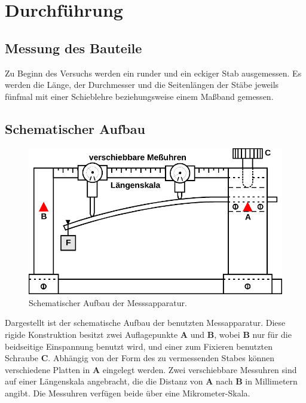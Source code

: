 \section{Durchführung} \label{sec:durchführung}

\subsection{Messung des Bauteile} \label{sec:bauteile}

    Zu Beginn des Versuchs werden ein runder und ein eckiger Stab ausgemessen.
    Es werden die Länge, der Durchmesser und die Seitenlängen der Stäbe jeweils fünfmal mit
    einer Schieblehre beziehungsweise einem Maßband gemessen.

\subsection{Schematischer Aufbau}

\begin{figure}
  \centering
  \includegraphics[width=\textwidth]{content/img/Abb_6.pdf}
  \caption{Schematischer Aufbau der Messsapparatur. \cite{img_aufbau}}
  \label{fig:aufbau}
\end{figure}

Dargestellt ist der schematische Aufbau der benutzten Messapparatur.
Diese rigide Konstruktion besitzt zwei Auflagepunkte \textbf{A} und \textbf{B},
wobei \textbf{B} nur für die beidseitige Einspannung benutzt wird,
und einer zum Fixieren benutzten Schraube \textbf{C}.
Abhängig von der Form des zu vermessenden Stabes können verschiedene Platten in \textbf{A} eingelegt werden.
Zwei verschiebbare Messuhren sind auf einer Längenskala angebracht, die die Distanz von \textbf{A} nach \textbf{B} in Millimetern angibt. Die Messuhren verfügen beide über eine Mikrometer-Skala.

